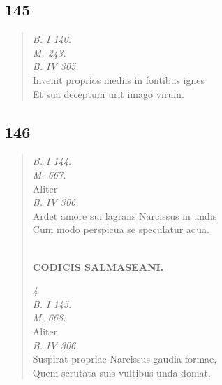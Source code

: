 \documentclass[11pt, a4paper]{report}
\begin{document}
            \subsection*{145}
      \begin{verse}
      \textit{B. I 140.} \\ \textit{M. 243.} \\ \textit{B. IV 305.} \\ Invenit proprios mediis in fontibus ignes \\ Et sua deceptum urit imago virum. \\ 
      \end{verse}
  
            \subsection*{146}
      \begin{verse}
      \textit{B. I 144.} \\ \textit{M. 667.} \\ Aliter \\ \textit{B. IV 306.} \\ Ardet amore sui lagrans Narcissus in undis \\ Cum modo perspicua se speculatur aqua. \\ 
        ﻿\pagebreak 
    \begin{center} \textbf{CODICIS SALMASEANI.} \end{center} \marginpar{[143]} \textit{4} \\ \textit{B. I 145.} \\ \textit{M. 668.} \\ Aliter \\ \textit{B. IV 306.} \\ Suspirat propriae Narcissus gaudia formae, \\ Quem scrutata suis vultibus unda domat. \\ 
      \end{verse}
  
\end{document}
